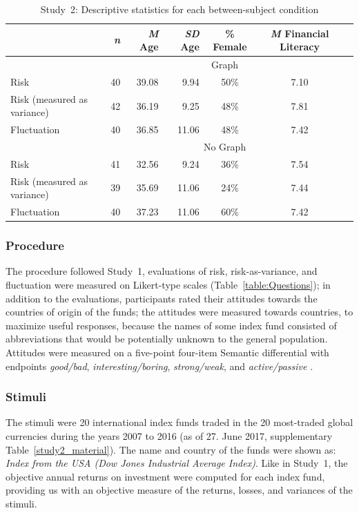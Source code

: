 \documentclass[a4paper,man, natbib,floatsintext]{apa6} %
\begin{document}
\begin{table}[ht]
\centering
\caption{Study~2: Descriptive statistics for each between-subject condition}
\label{tab:study2_subsample}
\begin{tabular}{lrrrccc}
\toprule
  & \textit{n} & \textit{M} Age & \textit{SD} Age & \% Female & \textit{M} Financial Literacy \\ 
    \toprule
    & \multicolumn{5}{c}{Graph}\\
   \cmidrule{2-6}
   Risk &  40 & 39.08 & 9.94 & 50\% & 7.10 \\ 
   Risk (measured as variance) &  42 & 36.19 & 9.25 & 48\% & 7.81 \\ 
   Fluctuation &  40 & 36.85 & 11.06 & 48\% & 7.42 \\ 
   \midrule
  & \multicolumn{5}{c}{No Graph}\\
  \cmidrule{2-6}
  Risk &  41 & 32.56 & 9.24 & 36\% & 7.54 \\ 
  Risk (measured as variance) &  39 & 35.69 & 11.06 & 24\% & 7.44 \\ 
  Fluctuation &  40 & 37.23 & 11.06 & 60\% & 7.42 \\ 
   \bottomrule
\end{tabular}
\end{table}

\subsubsection{Procedure}
The procedure followed Study~1, evaluations of risk, risk-as-variance, and fluctuation were measured on Likert-type scales (Table~\ref{table:Questions}); in addition to the evaluations, participants rated their attitudes towards the countries of origin of the funds; the attitudes were measured towards countries, to maximize useful responses, because the names of some index fund consisted of abbreviations that would be potentially unknown to the general population. Attitudes were measured on a five-point four-item Semantic differential with endpoints \textit{good/bad}, \textit{interesting/boring}, \textit{strong/weak}, and \textit{active/passive} \citep{Kempf2014}.

\subsubsection{Stimuli}
The stimuli were 20 international index funds traded in the 20 most-traded global currencies during the years 2007 to 2016 (as of 27. June 2017, supplementary Table~\ref{study2_material}). The name and country of the funds were shown as: \textit{Index from the USA (Dow Jones Industrial Average Index)}. Like in Study~1, the objective annual returns on investment were computed for each index fund, providing us with an objective measure of the returns, losses, and variances of the stimuli.
\end{document}
